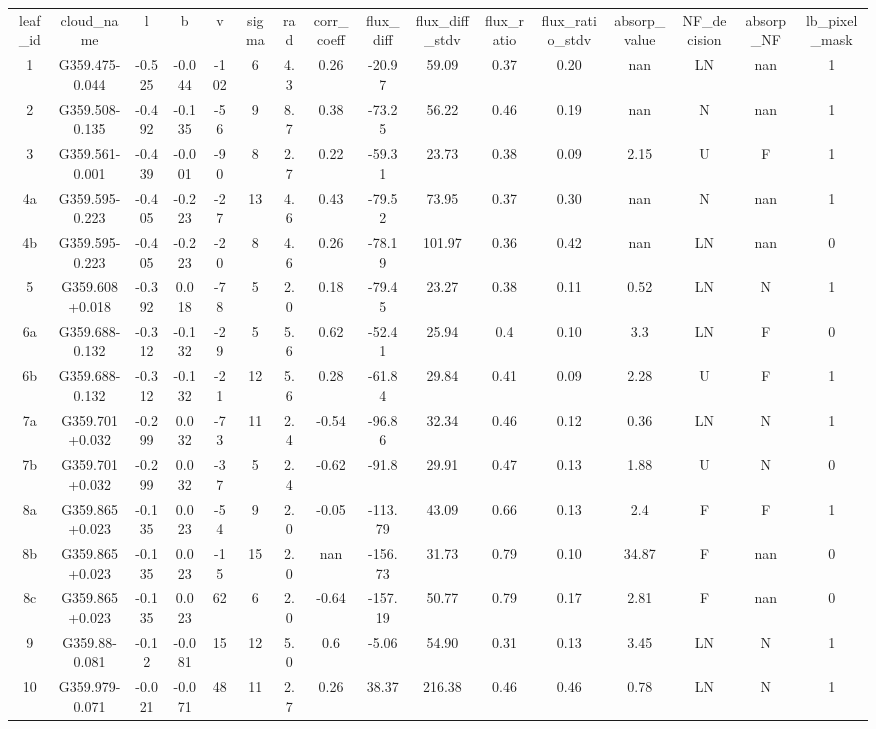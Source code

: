 \begin{table}
\begin{tabular}{cccccccccccccccc}
leaf_id & cloud_name & l & b & v & sigma & rad & corr_coeff & flux_diff & flux_diff_stdv & flux_ratio & flux_ratio_stdv & absorp_value & NF_decision & absorp_NF & lb_pixel_mask \\
1 & G359.475-0.044 & -0.525 & -0.044 & -102 & 6 & 4.3 & 0.26 & -20.97 & 59.09 & 0.37 & 0.20 & nan & LN & nan & 1 \\
2 & G359.508-0.135 & -0.492 & -0.135 & -56 & 9 & 8.7 & 0.38 & -73.25 & 56.22 & 0.46 & 0.19 & nan & N & nan & 1 \\
3 & G359.561-0.001 & -0.439 & -0.001 & -90 & 8 & 2.7 & 0.22 & -59.31 & 23.73 & 0.38 & 0.09 & 2.15 & U & F & 1 \\
4a & G359.595-0.223 & -0.405 & -0.223 & -27 & 13 & 4.6 & 0.43 & -79.52 & 73.95 & 0.37 & 0.30 & nan & N & nan & 1 \\
4b & G359.595-0.223 & -0.405 & -0.223 & -20 & 8 & 4.6 & 0.26 & -78.19 & 101.97 & 0.36 & 0.42 & nan & LN & nan & 0 \\
5 & G359.608+0.018 & -0.392 & 0.018 & -78 & 5 & 2.0 & 0.18 & -79.45 & 23.27 & 0.38 & 0.11 & 0.52 & LN & N & 1 \\
6a & G359.688-0.132 & -0.312 & -0.132 & -29 & 5 & 5.6 & 0.62 & -52.41 & 25.94 & 0.4 & 0.10 & 3.3 & LN & F & 0 \\
6b & G359.688-0.132 & -0.312 & -0.132 & -21 & 12 & 5.6 & 0.28 & -61.84 & 29.84 & 0.41 & 0.09 & 2.28 & U & F & 1 \\
7a & G359.701+0.032 & -0.299 & 0.032 & -73 & 11 & 2.4 & -0.54 & -96.86 & 32.34 & 0.46 & 0.12 & 0.36 & LN & N & 1 \\
7b & G359.701+0.032 & -0.299 & 0.032 & -37 & 5 & 2.4 & -0.62 & -91.8 & 29.91 & 0.47 & 0.13 & 1.88 & U & N & 0 \\
8a & G359.865+0.023 & -0.135 & 0.023 & -54 & 9 & 2.0 & -0.05 & -113.79 & 43.09 & 0.66 & 0.13 & 2.4 & F & F & 1 \\
8b & G359.865+0.023 & -0.135 & 0.023 & -15 & 15 & 2.0 & nan & -156.73 & 31.73 & 0.79 & 0.10 & 34.87 & F & nan & 0 \\
8c & G359.865+0.023 & -0.135 & 0.023 & 62 & 6 & 2.0 & -0.64 & -157.19 & 50.77 & 0.79 & 0.17 & 2.81 & F & nan & 0 \\
9 & G359.88-0.081 & -0.12 & -0.081 & 15 & 12 & 5.0 & 0.6 & -5.06 & 54.90 & 0.31 & 0.13 & 3.45 & LN & N & 1 \\
10 & G359.979-0.071 & -0.021 & -0.071 & 48 & 11 & 2.7 & 0.26 & 38.37 & 216.38 & 0.46 & 0.46 & 0.78 & LN & N & 1 \\

\end{tabular}
\end{table}
